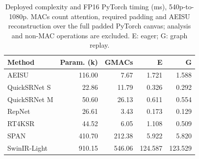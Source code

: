 \begin{table}[t]
\centering\small
\caption{Deployed complexity and FP16 PyTorch timing (ms), 540p-to-1080p. MACs count attention, required padding and AEISU reconstruction over the full padded PyTorch canvas; analysis and non-MAC operations are excluded. E: eager; G: graph replay.}
\label{tab:comparator-complexity}
\begin{tabularx}{\columnwidth}{Yrrrr}
\toprule
Method & Param. (k) & GMACs & E & G\\
\midrule
AEISU & 116.00 & 7.67 & 1.721 & 1.588\\
QuickSRNet S & 22.86 & 11.79 & 0.326 & 0.292\\
QuickSRNet M & 50.60 & 26.13 & 0.611 & 0.554\\
RepNet & 26.61 & 3.43 & 0.173 & 0.129\\
RT4KSR & 44.52 & 6.05 & 1.108 & 0.509\\
SPAN & 410.70 & 212.38 & 5.922 & 5.820\\
SwinIR-Light & 910.15 & 546.06 & 124.587 & 123.529\\
\bottomrule
\end{tabularx}
\end{table}
